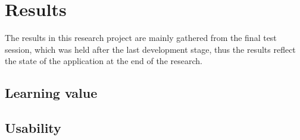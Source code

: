 


\chapter{Results}\label{chap:results}




The results in this research project are mainly gathered from the final test session, which was held after the last development stage, thus the results reflect the state of the application at the end of the research. 


\section{Learning value}

\section{Usability}







